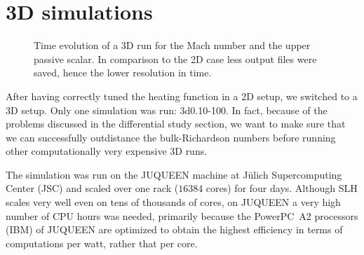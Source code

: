\section{3D simulations}
\begin{figure}[b!]
      \centering
     \centering
	\hfill
	\caption{Time evolution of a 3D run for the Mach number and the upper passive scalar. In comparison to the 2D case less output files were saved, hence the lower resolution in time.}
	\label{fig:3dsingle}
\end{figure}
After having correctly tuned the heating function in a 2D setup, we switched to a 3D setup. Only one simulation was run: 3d0.10-100. In fact, because of the problems discussed in the differential study section, we want to make sure that we can successfully outdistance the bulk-Richardson numbers before running other computationally very expensive 3D runs.

The simulation was run on the JUQUEEN machine at Jülich Supercomputing Center (JSC) and scaled over one rack ($16384$ cores) for four days. Although SLH scales very well even on tens of thousands of cores, on JUQUEEN a very high number of CPU hours was needed, primarily because the PowerPC\textregistered \ A2 processors (IBM) of JUQUEEN are optimized to obtain the highest efficiency in terms of computations per watt, rather that per core. 
 
